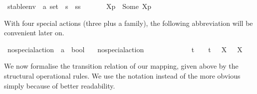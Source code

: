 \begin{isabellebody}
\isamarkupfalse%
\ stable{\isacharunderscore}{\kern0pt}env\ {\isacharcolon}{\kern0pt}{\isacharcolon}{\kern0pt}\ {\isacartoucheopen}{\isacharprime}{\kern0pt}a\ set\ {\isasymRightarrow}\ {\isacharprime}{\kern0pt}s\ {\isasymRightarrow}\ {\isacharprime}{\kern0pt}ss{\isacartoucheclose}\ \isanewline
\ \ {\isacharparenleft}{\kern0pt}{\isacartoucheopen}{\isasymtheta}{\isacharbrackleft}{\kern0pt}{\isacharunderscore}{\kern0pt}{\isacharbrackright}{\kern0pt}{\isacharprime}{\kern0pt}{\isacharparenleft}{\kern0pt}{\isacharunderscore}{\kern0pt}{\isacharprime}{\kern0pt}{\isacharparenright}{\kern0pt}{\isacartoucheclose}{\isacharparenright}{\kern0pt}\isanewline
\ \ \ {\isacartoucheopen}{\isasymtheta}{\isacharbrackleft}{\kern0pt}X{\isacharbrackright}{\kern0pt}{\isacharparenleft}{\kern0pt}p{\isacharparenright}{\kern0pt}\ {\isasymequiv}\ {\isasymtheta}{\isacharquery}{\kern0pt}{\isacharbrackleft}{\kern0pt}Some\ X{\isacharbrackright}{\kern0pt}{\isacharparenleft}{\kern0pt}p{\isacharparenright}{\kern0pt}{\isacartoucheclose}%
\begin{isamarkuptext}%
With four special actions (three plus a family), the following abbreviation will be convenient later on.%
\end{isamarkuptext}\isamarkuptrue%
\isamarkupfalse%
\ no{\isacharunderscore}{\kern0pt}special{\isacharunderscore}{\kern0pt}action\ {\isacharcolon}{\kern0pt}{\isacharcolon}{\kern0pt}\ {\isacartoucheopen}{\isacharprime}{\kern0pt}a\ {\isasymRightarrow}\ bool{\isacartoucheclose}\isanewline
\ \ \ {\isacartoucheopen}no{\isacharunderscore}{\kern0pt}special{\isacharunderscore}{\kern0pt}action\ {\isasymalpha}\ \isanewline
\ \ \ \ {\isasymequiv}\ {\isasymalpha}\ {\isasymnoteq}\ {\isasymtau}\ {\isasymand}\ {\isasymalpha}\ {\isasymnoteq}\ t\ {\isasymand}\ {\isasymalpha}\ {\isasymnoteq}\ t{\isacharunderscore}{\kern0pt}{\isasymepsilon}\ {\isasymand}\ {\isacharparenleft}{\kern0pt}{\isasymforall}\ X{\isachardot}{\kern0pt}\ {\isasymalpha}\ {\isasymnoteq}\ {\isasymepsilon}{\isacharbrackleft}{\kern0pt}X{\isacharbrackright}{\kern0pt}{\isacharparenright}{\kern0pt}{\isacartoucheclose}\isanewline
\isanewline
%
\isadelimunimportant
%
\endisadelimunimportant
%
\isatagunimportant
%
\endisatagunimportant
{\isafoldunimportant}%
%
\isadelimunimportant
%
\endisadelimunimportant
%
\isadelimdocument
%
\endisadelimdocument
%
\isatagdocument
%
\isamarkuptrue%
%
\endisatagdocument
{\isafolddocument}%
%
\isadelimdocument
%
\endisadelimdocument
%
\begin{isamarkuptext}%
We now formalise the transition relation of our mapping, given above by the structural operational rules. We use the notation \isa{{\isacharunderscore}{\kern0pt}\ {\isasymlongmapsto}\isactrlsup {\isasymtheta}{\isacharunderscore}{\kern0pt}\ {\isacharunderscore}{\kern0pt}} instead of the more obvious \isa{{\isacharunderscore}{\kern0pt}\ {\isasymlongmapsto}\isactrlsub {\isasymtheta}{\isacharunderscore}{\kern0pt}\ {\isacharunderscore}{\kern0pt}} simply because of better readability.


\end{isamarkuptext}
\end{isabellebody}
